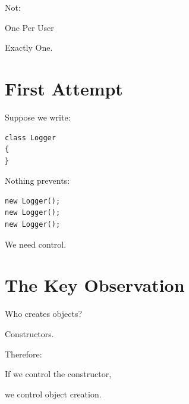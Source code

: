 \documentclass[11pt,a4paper]{book}
\begin{document}
Not:


One Per User


Exactly One.


\section{First Attempt}

Suppose we write:

\begin{verbatim}
class Logger
{
}
\end{verbatim}


Nothing prevents:

\begin{verbatim}
new Logger();
new Logger();
new Logger();
\end{verbatim}


We need control.


\section{The Key Observation}

Who creates objects?


Constructors.


Therefore:


If we control the constructor,

we control object creation.
\end{document}
